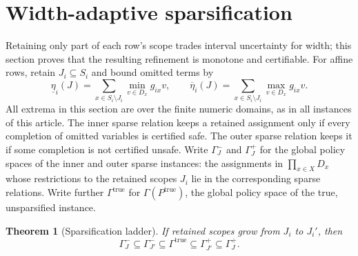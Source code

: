 \documentclass[11pt]{article}
\theoremstyle{plain}
\newtheorem{theorem}{Theorem}[section]
\theoremstyle{definition}
\theoremstyle{remark}
\begin{document}
\section{Width-adaptive sparsification}
\label{sec:sparsification}

Retaining only part of each row's scope trades interval uncertainty for
width; this section proves that the resulting refinement is monotone and
certifiable.  For affine rows, retain \(J_i\subseteq S_i\) and bound omitted terms by
\[
\underline\eta_i(J)=
\sum_{x\in S_i\setminus J_i}\min_{v\in D_x}g_{ix}v,
\qquad
\overline\eta_i(J)=
\sum_{x\in S_i\setminus J_i}\max_{v\in D_x}g_{ix}v.
\]
All extrema in this section are over the finite numeric domains, as in all
instances of this article.
The inner sparse relation keeps a retained assignment only if every completion
of omitted variables is certified safe.  The outer sparse relation keeps it if
some completion is not certified unsafe.  Write \(\Gamma^-_J\) and
\(\Gamma^+_J\) for the global policy spaces of the inner and outer sparse
instances: the assignments in \(\prod_{x\in X}D_x\) whose restrictions to
the retained scopes \(J_i\) lie in the corresponding sparse relations.  Write
further \(\Gamma^{\mathrm{true}}\) for \(\Gamma(P^{\mathrm{true}})\), the
global policy space of the true, unsparsified instance.

\begin{theorem}[Sparsification ladder]
If retained scopes grow from \(J_i\) to \(J_i'\), then
\[
  \Gamma^-_J
  \subseteq
  \Gamma^-_{J'}
  \subseteq
  \Gamma^{\mathrm{true}}
  \subseteq
  \Gamma^+_{J'}
  \subseteq
  \Gamma^+_J.
\]
\end{theorem}
\end{document}
